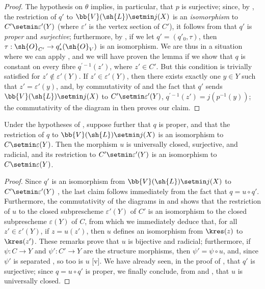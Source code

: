 \begin{proof}
The hypothesis on $\theta$ implies, in particular, that $p$ is surjective;
since, by , the restriction of $q'$ to $\bb{V}(\sh{L})\setmin j(X)$ is an \emph{isomorphism} to $C'\setmin\varepsilon'(Y)$ (where $\varepsilon'$ is the vertex section of $C'$), it follows from  that $q'$ is \emph{proper} and \emph{surjective};
furthermore, by , if we let $q'=(q'_0,\tau)$, then $\tau:\sh{O}_{C'}\to q'_*(\sh{O}_V)$ is an isomorphism.
We are thus in a situation where we can apply , and we will have proven the lemma if we show that $q$ is constant on every fibre $q^{'-1}(z')$, where $z'\in C'$.
But this condition is trivially satisfied for $z'\not\in\varepsilon'(Y)$.
If $z'\in\varepsilon'(Y)$, then there exists exactly one $y\in Y$ such that $z'=\varepsilon'(y)$, and, by commutativity of  and the fact that $q'$ sends $\bb{V}(\sh{L})\setmin j(X)$ to $C'\setmin\varepsilon'(Y)$, $q^{'-1}(z')=j(p^{-1}(y))$;
the commutativity of the diagram in  then proves our claim.
\end{proof}

\begin{corollary}[8.11.6]
\label{II.8.11.6}
Under the hypotheses of , suppose further that $q$ is proper, and that the restriction of $q$ to $\bb{V}(\sh{L})\setmin j(X)$ is an isomorphism to $C\setmin\varepsilon(Y)$.
Then the morphism $u$ is universally closed, surjective, and radicial, and its restriction to $C'\setmin\varepsilon'(Y)$ is an isomorphism to $C\setmin\varepsilon(Y)$.
\end{corollary}

\begin{proof}
Since $q'$ is an isomorphism from $\bb{V}(\sh{L})\setmin j(X)$ to $C'\setmin\varepsilon'(Y)$ , the last claim follows immediately from the fact that $q=u\circ q'$.
Furthermore, the commutativity of the diagrams
in  and  shows that the restriction of $u$ to the closed subprescheme $\varepsilon'(Y)$ of $C'$ is an isomorphism to the closed subprescheme $\varepsilon(Y)$ of $C$, from which we immediately deduce that, for all $z'\in\varepsilon'(Y)$, if $z=u(z')$, then $u$ defines an isomorphism from $\kres(z)$ to $\kres(z')$.
These remarks prove that $u$ is bijective and radicial;
furthermore, if $\psi:C\to Y$ and $\psi':C'\to Y$ are the structure morphisms, then $\psi'=\psi\circ u$, and, since $\psi'$ is separated , so too is $u$ [v].
We have already seen, in the proof of , that $q'$ is surjective;
since $q=u\circ q'$ is proper, we finally conclude, from  and , that $u$ is universally closed.
\end{proof}

